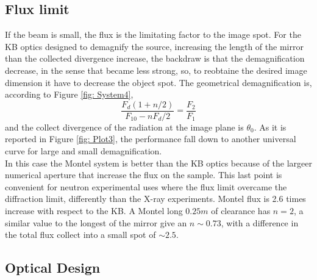 \subsection{Flux limit}
If the beam is small, the flux is the limitating factor to the image spot. For the KB optics designed to demagnify the source, increasing the length of the mirror than the collected divergence increase, the backdraw is that the demagnification decrease, in the sense that became less strong, so, to reobtaine the desired image dimension it have to decrease the object spot. The geometrical demagnification is, according to Figure \ref{fig: System4},
\begin{equation}
\frac{F_d (1 + n / 2 )}{F_10 - n F_d / 2} =\frac{F_2}{F_1}
\label{eq: geometrical demag}
\end{equation}
\noindent and the collect divergence of the radiation at the image plane is $\theta_0 $. As it is reported in Figure \ref{fig: Plot3}, the performance fall down to another universal curve for large and small demagnification.
\\
In this case the Montel system is better than the KB optics because of the largeer numerical aperture that increase the flux on the sample. This last point is convenient for neutron experimental uses where the flux limit overcame the diffraction limit, differently than the X-ray experiments. Montel flux is 2.6 times increase with respect to the KB. A Montel long $0.25m $ of clearance has $n = 2 $, a similar value to the longest of the mirror give an $n \sim 0.73 $, with a difference in the total flux collect into a small spot of $\sim 2.5$.
\subsection{Optical Design}

